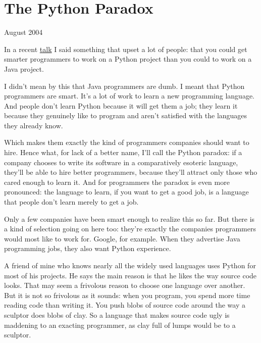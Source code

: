 \chapter{The Python Paradox}


            
              
                

August 2004

In a recent
                  \href{http://www.paulgraham.com/gh.html}{talk} I said something that upset a lot
                  of people: that you could get smarter programmers to work on a
                  Python project than you could to work on a Java project.

I
                  didn't mean by this that Java programmers are dumb. I meant
                  that Python programmers are smart. It's a lot of work to learn
                  a new programming language. And people don't learn Python
                  because it will get them a job; they learn it because they
                  genuinely like to program and aren't satisfied with the
                  languages they already know.

Which makes them
                  exactly the kind of programmers companies should want to hire.
                  Hence what, for lack of a better name, I'll call the Python
                  paradox: if a company chooses to write its software in a
                  comparatively esoteric language, they'll be able to hire
                  better programmers, because they'll attract only those who
                  cared enough to learn it. And for programmers the paradox is
                  even more pronounced: the language to learn, if you want to
                  get a good job, is a language that people don't learn merely
                  to get a job.

Only a few companies have been smart
                  enough to realize this so far. But there is a kind of
                  selection going on here too: they're exactly the companies
                  programmers would most like to work for. Google, for example.
                  When they advertise Java programming jobs, they also want
                  Python experience.

A friend of mine who knows
                  nearly all the widely used languages uses Python for most of
                  his projects. He says the main reason is that he likes the way
                  source code looks. That may seem a frivolous reason to choose
                  one language over another. But it is not so frivolous as it
                  sounds: when you program, you spend more time reading code
                  than writing it. You push blobs of source code around the way
                  a sculptor does blobs of clay. So a language that makes source
                  code ugly is maddening to an exacting programmer, as clay full
                  of lumps would be to a sculptor.

